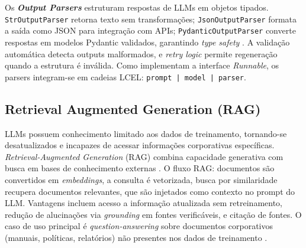 \documentclass[12pt]{article}
\begin{document}

Os \textbf{\textit{Output Parsers}} estruturam respostas de LLMs em objetos tipados. \texttt{StrOutputParser} retorna texto sem transformações; \texttt{JsonOutputParser} formata a saída como JSON para integração com APIs; \texttt{PydanticOutputParser} converte respostas em modelos Pydantic validados, garantindo \textit{type safety} \cite{langchain2023docs}. A validação automática detecta outputs malformados, e \textit{retry logic} permite regeneração quando a estrutura é inválida. Como implementam a interface \textit{Runnable}, os parsers integram-se em cadeias LCEL: \texttt{prompt | model | parser}.

\subsection{Retrieval Augmented Generation (RAG)}
\label{subsec:rag}


LLMs possuem conhecimento limitado aos dados de treinamento, tornando-se desatualizados e incapazes de acessar informações corporativas específicas. \textit{Retrieval-Augmented Generation} (RAG) combina capacidade generativa com busca em bases de conhecimento externas \cite{lewis2020retrieval}. O fluxo RAG: documentos são convertidos em \textit{embeddings}, a consulta é vetorizada, busca por similaridade recupera documentos relevantes, que são injetados como contexto no prompt do LLM. Vantagens incluem acesso a informação atualizada sem retreinamento, redução de alucinações via \textit{grounding} em fontes verificáveis, e citação de fontes. O caso de uso principal é \textit{question-answering} sobre documentos corporativos (manuais, políticas, relatórios) não presentes nos dados de treinamento \cite{langchain2023docs}.
\end{document}
